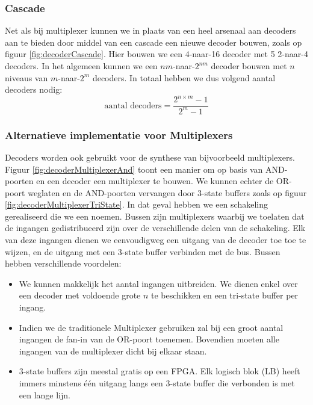 \subsubsection{Cascade}
Net als bij multiplexer kunnen we in plaats van een heel arsenaal aan decoders aan te bieden door middel van een cascade een nieuwe decoder bouwen, zoals op figuur \ref{fig:decoderCascade}. Hier bouwen we een 4-naar-16 decoder met 5 2-naar-4 decoders. In het algemeen kunnen we een $nm$-naar-$2^{nm}$ decoder bouwen met $n$ niveaus van $m$-naar-$2^m$ decoders. In totaal hebben we dus volgend aantal decoders nodig:
\begin{equation}
\mbox{aantal decoders}=\displaystyle\frac{2^{n\times m}-1}{2^m-1}
\end{equation}
\subsubsection{Alternatieve implementatie voor Multiplexers}
Decoders worden ook gebruikt voor de synthese van bijvoorbeeld multiplexers. Figuur \ref{fig:decoderMultiplexerAnd} toont een manier om op basis van AND-poorten en een decoder een multiplexer te bouwen. We kunnen echter de OR-poort weglaten en de AND-poorten vervangen door 3-state buffers zoals op figuur \ref{fig:decoderMultiplexerTriState}. In dat geval hebben we een schakeling gerealiseerd die we een  noemen. Bussen zijn multiplexers waarbij we toelaten dat de ingangen gedistribueerd zijn over de verschillende delen van de schakeling. Elk van deze ingangen dienen we eenvoudigweg een uitgang van de decoder toe toe te wijzen, en de uitgang met een 3-state buffer verbinden met de bus. Bussen hebben verschillende voordelen:
\begin{itemize}
 \item We kunnen makkelijk het aantal ingangen uitbreiden. We dienen enkel over een decoder met voldoende grote $n$ te beschikken en een tri-state buffer per ingang.
 \item Indien we de traditionele Multiplexer gebruiken zal bij een groot aantal ingangen de fan-in van de OR-poort toenemen. Bovendien moeten alle ingangen van de multiplexer dicht bij elkaar staan.
 \item 3-state buffers zijn meestal gratis op een FPGA. Elk logisch blok (LB) heeft immers minstens \'e\'en uitgang langs een 3-state buffer die verbonden is met een lange lijn.
\end{itemize}
